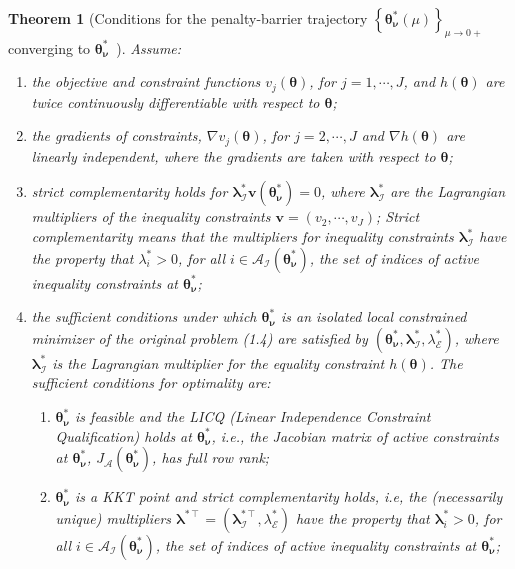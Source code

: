 \documentclass{article}
\newcommand{\itl}{\intercal}
\newcommand{\bs}{ \boldsymbol}
\newcommand{\ml}{\mathcal}
\newcommand{\lt}{\left}
\newcommand{\rt}{\right}
\newtheorem{theorem}{Theorem}[section]
\begin{document}
\begin{theorem}[Conditions for the penalty-barrier trajectory $\lt\{ \bs{\theta}_{\bs{\nu}}^*(\mu)\rt\}_{\mu \to 0+}$ converging to $\bs{\theta}_{\bs{\nu}}^*$~\cite{NoceWrig06,fiacco,Forsgren2002}]
	Assume:
	\begin{enumerate}
		\item the objective and constraint functions $v_j\lt(\bs{\theta}\rt)$, for $j = 1, \cdots, J$, and $h\lt(\bs{\theta}\rt)$ are twice continuously differentiable with respect to $\bs{\theta}$;
		\item the gradients of constraints, $\nabla v_j(\bs{\theta})$, for $j = 2, \cdots, J$ and $\nabla h(\bs{\theta})$ are linearly independent, where the gradients are taken with respect to $\bs{\theta}$;
		\item strict complementarity holds for  $\bs{\lambda}_{\ml{I}}^* \bs{v}(\bs{\theta}_{\bs{\nu}}^*) = 0$, where $\bs{\lambda}_{\ml{I}}^*$ are the Lagrangian multipliers of the inequality constraints $\bs{v} = \lt(v_2, \cdots, v_J\rt)$; Strict complementarity means that the multipliers for inequality constraints $\bs{\lambda}_{\ml{I}}^{*}$ have the property that $\lambda_i^* > 0$, for all $i  \in \mathcal{A}_{\mathcal{I}}(\bs{\theta}_{\bs{\nu}}^*)$, the set of indices of active inequality constraints at $\bs{\theta}_{\bs{\nu}}^*$;		\item the sufficient conditions under which $\bs{\theta}_{\bs{\nu}}^*$ is an isolated local constrained minimizer of the original problem (1.4) are satisfied by $\lt(\bs{\theta}^*_{\bs{\nu}}, \bs{\lambda}_{\ml{I}}^*, \lambda_{\ml{E}}^*\rt)$, where $\bs{\lambda}_{\ml{I}}^*$ is the Lagrangian multiplier for the equality constraint $h(\bs{\theta})$. The sufficient conditions for optimality are:
		\begin{enumerate}
			\item $\bs{\theta}_{\bs{\nu}}^*$ is feasible and the LICQ (Linear Independence Constraint Qualification) holds at $\bs{\theta}_{\bs{\nu}}^*$, i.e., the Jacobian matrix of active constraints at $\bs{\theta}_{\bs{\nu}}^*$, $J_{\mathcal{A}}(\bs{\theta}_{\bs{\nu}}^*)$, has full row rank;
			\item $\bs{\theta}_{\bs{\nu}}^*$ is a KKT point and strict complementarity holds, i.e, the (necessarily unique) multipliers $\bs{\lambda}^{*\itl} =  \lt(\bs{\lambda}_{\ml{I}}^{*\itl}, \lambda_{\ml{E}}^*\rt)$ have the property that $\bs{\lambda}_i^* > 0$, for all $i  \in \mathcal{A}_{\mathcal{I}}(\bs{\theta}_{\bs{\nu}}^*)$, the set of indices of active inequality constraints at $\bs{\theta}_{\bs{\nu}}^*$;

\end{enumerate}
\end{enumerate}
\end{theorem}
\end{document}
